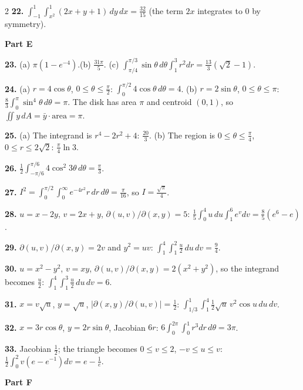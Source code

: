 \documentclass[11pt,oneside]{article}
\newcommand{\dA}{\,dA}
\begin{document}
{\begin{multicols}{2}
\textbf{22.} $\displaystyle\int_{-1}^{1}\!\!\int_{x^{2}}^{1}(2x+y+1)\,dy\,dx=\tfrac{32}{15}$
(the term $2x$ integrates to $0$ by symmetry).

\vspace{4pt}
\textbf{Part E}\par\vspace{2pt}

\textbf{23.} (a) $\pi\left(1-e^{-4}\right)$.\quad (b) $\tfrac{31\pi}{5}$.\quad
(c) $\int_{\pi/4}^{\pi/3}\sin\theta\,d\theta\int_1^3r^{2}dr=\tfrac{13}{3}\left(\sqrt2-1\right)$.

\textbf{24.} (a) $r=4\cos\theta$, $0\le\theta\le\tfrac{\pi}{2}$:
$\int_0^{\pi/2}4\cos\theta\,d\theta=4$.\quad
(b) $r=2\sin\theta$, $0\le\theta\le\pi$: $\tfrac83\int_0^{\pi}\sin^{4}\theta\,d\theta=\pi$.
The disk has area $\pi$ and centroid $(0,1)$, so $\iint y\dA=\bar y\cdot\text{area}=\pi$.

\textbf{25.} (a) The integrand is $r^{4}-2r^{2}+4$: $\tfrac{20}{3}$.\quad
(b) The region is $0\le\theta\le\tfrac{\pi}{4}$, $0\le r\le2\sqrt2$: $\tfrac{\pi}{4}\ln3$.

\textbf{26.} $\tfrac12\int_{-\pi/6}^{\pi/6}4\cos^{2}3\theta\,d\theta=\tfrac{\pi}{3}$.

\textbf{27.} $I^{2}=\int_0^{\pi/2}\!\int_0^{\infty}e^{-4r^{2}}r\,dr\,d\theta=\tfrac{\pi}{16}$,
so $I=\tfrac{\sqrt\pi}{4}$.

\textbf{28.} $u=x-2y$, $v=2x+y$, $\partial(u,v)/\partial(x,y)=5$:
$\tfrac15\int_0^4u\,du\int_1^6e^{v}dv=\tfrac85\left(e^{6}-e\right)$.

\textbf{29.} $\partial(u,v)/\partial(x,y)=2v$ and $y^{2}=uv$:
$\int_1^4\!\int_1^2\tfrac{u}{2}\,du\,dv=\tfrac94$.

\textbf{30.} $u=x^{2}-y^{2}$, $v=xy$, $\partial(u,v)/\partial(x,y)=2\left(x^{2}+y^{2}\right)$,
so the integrand becomes $\tfrac{u}{2}$: $\int_1^4\!\int_1^3\tfrac{u}{2}\,du\,dv=6$.

\textbf{31.} $x=v\sqrt u$, $y=\sqrt u$, $\left|\partial(x,y)/\partial(u,v)\right|=\tfrac12$:
$\displaystyle\int_{1/3}^{1}\!\!\int_1^4\tfrac12\sqrt u\,v^{2}\cos u\,du\,dv$.

\textbf{32.} $x=3r\cos\theta$, $y=2r\sin\theta$, Jacobian $6r$:
$6\int_0^{2\pi}\!\int_0^1r^{3}dr\,d\theta=3\pi$.

\textbf{33.} Jacobian $\tfrac12$; the triangle becomes $0\le v\le2$, $-v\le u\le v$:
$\tfrac12\int_0^2v\left(e-e^{-1}\right)dv=e-\tfrac1e$.

\vspace{4pt}
\textbf{Part F}\par\vspace{2pt}


\end{multicols}}
\end{document}

